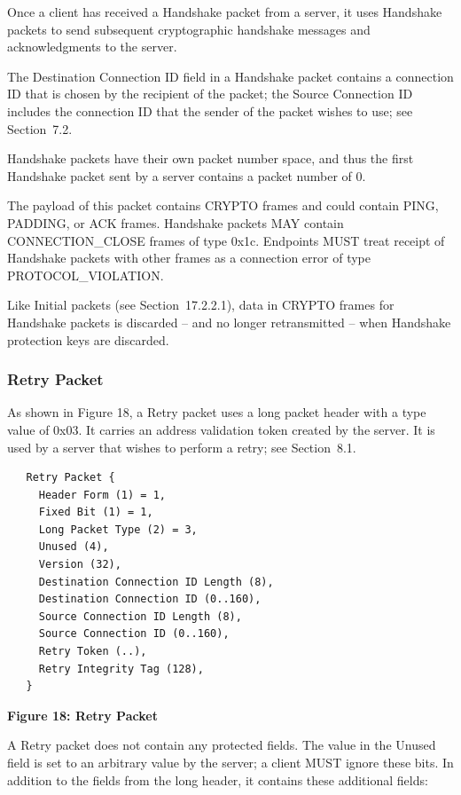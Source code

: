 \documentclass{article}
\begin{document}
Once a client has received a Handshake packet from a server, it uses Handshake packets to send subsequent cryptographic handshake messages and acknowledgments to the server.

The Destination Connection ID field in a Handshake packet contains a connection ID that is chosen by the recipient of the packet; the Source Connection ID includes the connection ID that the sender of the packet wishes to use; see Section~7.2.

Handshake packets have their own packet number space, and thus the first Handshake packet sent by a server contains a packet number of 0.

The payload of this packet contains CRYPTO frames and could contain PING, PADDING, or ACK frames.  Handshake packets MAY contain CONNECTION\_CLOSE frames of type 0x1c.  Endpoints MUST treat receipt of Handshake packets with other frames as a connection error of type PROTOCOL\_VIOLATION.

Like Initial packets (see Section~17.2.2.1), data in CRYPTO frames for Handshake packets is discarded -- and no longer retransmitted -- when Handshake protection keys are discarded.

\subsubsection{Retry Packet}

As shown in Figure 18, a Retry packet uses a long packet header with a type value of 0x03.  It carries an address validation token created by the server.  It is used by a server that wishes to perform a retry; see Section~8.1.

\begin{verbatim}
   Retry Packet {
     Header Form (1) = 1,
     Fixed Bit (1) = 1,
     Long Packet Type (2) = 3,
     Unused (4),
     Version (32),
     Destination Connection ID Length (8),
     Destination Connection ID (0..160),
     Source Connection ID Length (8),
     Source Connection ID (0..160),
     Retry Token (..),
     Retry Integrity Tag (128),
   }
\end{verbatim}

\begin{center}
\textbf{Figure 18: Retry Packet}
\end{center}

A Retry packet does not contain any protected fields.  The value in the Unused field is set to an arbitrary value by the server; a client MUST ignore these bits.  In addition to the fields from the long header, it contains these additional fields:
\end{document}
